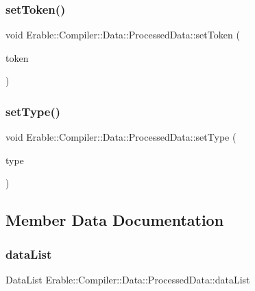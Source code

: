 \subsubsection{\texorpdfstring{setToken()}{setToken()}}
{\footnotesize\ttfamily void Erable\+::\+Compiler\+::\+Data\+::\+Processed\+Data\+::set\+Token (\begin{DoxyParamCaption}\item[{const \mbox{\hyperlink{struct_token}{Token}} \&}]{token }\end{DoxyParamCaption})}

\mbox{\label{struct_erable_1_1_compiler_1_1_data_1_1_processed_data_a367b0f13c30a4993af807d9047d0e9fd}} 
\subsubsection{\texorpdfstring{setType()}{setType()}}
{\footnotesize\ttfamily void Erable\+::\+Compiler\+::\+Data\+::\+Processed\+Data\+::set\+Type (\begin{DoxyParamCaption}\item[{const \mbox{\hyperlink{namespace_erable_1_1_compiler_1_1_symbols_a8f0bc762f448ea4d84e8713ab3e140b9}{Symbols\+::\+Symbol\+Ptr}} \&}]{type }\end{DoxyParamCaption})}



\subsection{Member Data Documentation}
\mbox{\label{struct_erable_1_1_compiler_1_1_data_1_1_processed_data_a3b56a46346d13ce73a9920b66ec79ce6}} 
\subsubsection{\texorpdfstring{dataList}{dataList}}
{\footnotesize\ttfamily Data\+List Erable\+::\+Compiler\+::\+Data\+::\+Processed\+Data\+::data\+List}

